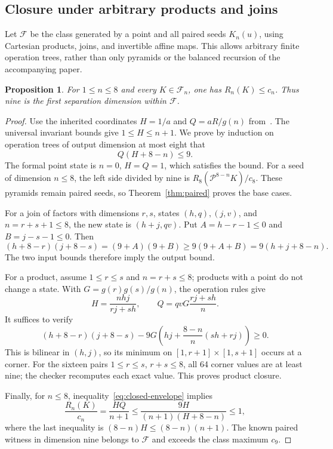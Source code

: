 \documentclass[11pt,a4paper]{article}
\newtheorem{proposition}{Proposition}
\begin{document}
\subsection{Closure under arbitrary products and joins}
Let $\mathcal F$ be the class generated by a point and all paired seeds
$K_n(u)$, using Cartesian products, joins, and invertible affine maps.
This allows arbitrary finite operation trees, rather than only pyramids
or the balanced recursion of the accompanying paper.

\begin{proposition}\label{prop:closure}
For $1\le n\le8$ and every $K\in\mathcal F_n$, one has $R_n(K)\le c_n$.
Thus nine is the first separation dimension within $\mathcal F$.
\end{proposition}
\begin{proof}
Use the inherited coordinates $H=1/a$ and $Q=aR/g(n)$ from~\cite{calculus}.
The universal invariant bounds give $1\le H\le n+1$. We prove by induction
on operation trees of output dimension at most eight that
\begin{equation}\label{eq:closed-envelope}
 Q(H+8-n)\le9.
\end{equation}
The formal point state is $n=0$, $H=Q=1$, which satisfies the bound.
For a seed of dimension $n\le8$, the left side divided by nine is
$R_8(\mathcal P^{8-n}K)/c_8$. These pyramids remain paired seeds, so
Theorem~\ref{thm:paired} proves the base cases.

For a join of factors with dimensions $r,s$, states $(h,q),(j,v)$, and
$n=r+s+1\le8$, the new state is $(h+j,qv)$. Put
$A=h-r-1\le0$ and $B=j-s-1\le0$. Then
\[
 (h+8-r)(j+8-s)=(9+A)(9+B)
 \ge9(9+A+B)=9(h+j+8-n).
\]
The two input bounds therefore imply the output bound.

For a product, assume $1\le r\le s$ and $n=r+s\le8$; products with a
point do not change a state. With $G=g(r)g(s)/g(n)$, the operation rules
give
\[
 H=\frac{nhj}{rj+sh},\qquad Q=qvG\frac{rj+sh}{n}.
\]
It suffices to verify
\begin{equation}\label{eq:product-envelope}
 (h+8-r)(j+8-s)
 -9G\left(hj+\frac{8-n}{n}(sh+rj)\right)\ge0.
\end{equation}
This is bilinear in $(h,j)$, so its minimum on
$[1,r+1]\times[1,s+1]$ occurs at a corner. For the sixteen pairs
$1\le r\le s$, $r+s\le8$, all 64 corner values are at least nine;
the checker recomputes each exact value. This proves product closure.

Finally, for $n\le8$, inequality~\eqref{eq:closed-envelope} implies
\[
 \frac{R_n(K)}{c_n}=\frac{HQ}{n+1}
 \le\frac{9H}{(n+1)(H+8-n)}\le1,
\]
where the last inequality is $(8-n)H\le(8-n)(n+1)$.
The known paired witness in dimension nine belongs to $\mathcal F$ and
exceeds the class maximum $c_9$.
\end{proof}
\end{document}

